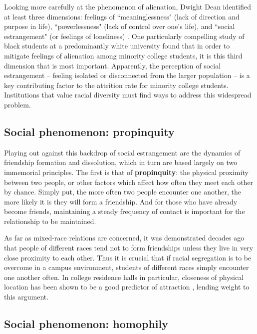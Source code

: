 Looking more carefully at the phenomenon of alienation, Dwight Dean identified
at least three dimensions: feelings of ``meaninglessness" (lack of direction
and purpose in life), ``powerlessness" (lack of control over one's life), and
``social estrangement" (or feelings of loneliness)
\cite{dean_alienation:_1961}. One particularly compelling study of black
students at a predominantly white university \cite{suen_alienation_1983} found
that in order to mitigate feelings of alienation among minority college
students, it is this third dimension that is most important. Apparently, the
perception of social estrangement -- feeling isolated or disconnected from the
larger population -- is a key contributing factor to the attrition rate for
minority college students. Institutions that value racial diversity must find
ways to address this widespread problem.

\subsection{Social phenomenon: propinquity}

Playing out against this backdrop of social estrangement are the dynamics of
friendship formation and dissolution, which in turn are based largely on two
immemorial principles. The first is that of \textbf{propinquity}: the physical
proximity between two people, or other factors which affect how often they
meet each other by chance\cite{festinger_social_1950}. Simply put, the more
often two people encounter one another, the more likely it is they will form a
friendship. And for those who have already become friends, maintaining a
steady frequency of contact is important for the relationship to be
maintained.

As far as mixed-race relations are concerned, it was demonstrated decades ago
\cite{nahemow_similarity_1975} that people of different races tend not to form
friendships unless they live in very close proximity to each other. Thus it is
crucial that if racial segregation is to be overcome in a campus environment,
students of different races simply encounter one another often. In college
residence halls in particular, closeness of physical location has been shown
to be a good predictor of attraction \cite{priest_proximity_1967}, lending
weight to this argument.

\subsection{Social phenomenon: homophily}

